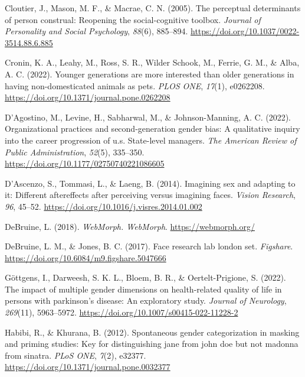 \documentclass[
  man]{apa7}
\newlength{\cslhangindent}
\newlength{\cslentryspacingunit} %
\newenvironment{CSLReferences}[2] %
 {%
  \setlength{\parindent}{0pt}
  \ifodd #1
  \let\oldpar\par
  \def\par{\hangindent=\cslhangindent\oldpar}
  \fi
  \setlength{\parskip}{#2\cslentryspacingunit}
 }%
 {}
\begin{document}
\begin{CSLReferences}{1}{0}
\leavevmode{}%
Cloutier, J., Mason, M. F., \& Macrae, C. N. (2005). The perceptual determinants of person construal: Reopening the social-cognitive toolbox. \emph{Journal of Personality and Social Psychology}, \emph{88}(6), 885--894. \url{https://doi.org/10.1037/0022-3514.88.6.885}

\leavevmode{}%
Cronin, K. A., Leahy, M., Ross, S. R., Wilder Schook, M., Ferrie, G. M., \& Alba, A. C. (2022). Younger generations are more interested than older generations in having non-domesticated animals as pets. \emph{{PLOS} {ONE}}, \emph{17}(1), e0262208. \url{https://doi.org/10.1371/journal.pone.0262208}

\leavevmode{}%
D'Agostino, M., Levine, H., Sabharwal, M., \& Johnson-Manning, A. C. (2022). Organizational practices and second-generation gender bias: A qualitative inquiry into the career progression of u.s. State-level managers. \emph{The American Review of Public Administration}, \emph{52}(5), 335--350. \url{https://doi.org/10.1177/02750740221086605}

\leavevmode{}%
D'Ascenzo, S., Tommasi, L., \& Laeng, B. (2014). Imagining sex and adapting to it: Different aftereffects after perceiving versus imagining faces. \emph{Vision Research}, \emph{96}, 45--52. \url{https://doi.org/10.1016/j.visres.2014.01.002}

\leavevmode{}%
DeBruine, L. (2018). \emph{{WebMorph}. {WebMorph}}. \url{https://webmorph.org/}

\leavevmode{}%
DeBruine, L. M., \& Jones, B. C. (2017). Face research lab london set. \emph{Figshare}. \url{https://doi.org/10.6084/m9.figshare.5047666}

\leavevmode{}%
Göttgens, I., Darweesh, S. K. L., Bloem, B. R., \& Oertelt-Prigione, S. (2022). The impact of multiple gender dimensions on health-related quality of life in persons with parkinson's disease: An exploratory study. \emph{Journal of Neurology}, \emph{269}(11), 5963--5972. \url{https://doi.org/10.1007/s00415-022-11228-2}

\leavevmode{}%
Habibi, R., \& Khurana, B. (2012). Spontaneous gender categorization in masking and priming studies: Key for distinguishing jane from john doe but not madonna from sinatra. \emph{{PLoS} {ONE}}, \emph{7}(2), e32377. \url{https://doi.org/10.1371/journal.pone.0032377}


\end{CSLReferences}
\end{document}
